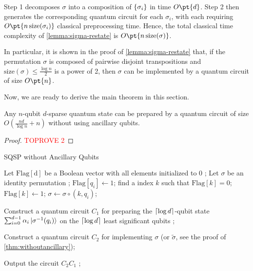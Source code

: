 \documentclass[a4paper,UKenglish,cleveref, autoref, thm-restate]{lipics-v2021}
\DeclarePairedDelimiter\rbra{\lparen}{\rparen}
\DeclarePairedDelimiter\cbra{\{}{\}}
\DeclarePairedDelimiter\ceil{\lceil}{\rceil}
\newcommand{\bo}{O\pt}
\begin{document}
Step 1 decomposes $\sigma$ into a composition of $\cbra{\sigma_i}$ in time $\bo{d}$. Step 2 then generates the corresponding quantum circuit for each $\sigma_i$, with each requiring $\bo{n\,\mathrm{size}(\sigma_i)}$ classical preprocessing time. Hence, the total classical time complexity of \cref{lemma:sigma-restate} is $\bo{n\,\mathrm{size}(\sigma)}$.

\begin{remark}\label{remark:sigma}
    In particular, it is shown in the proof of \cref{lemma:sigma-restate} that, if the permutation $\sigma$ is composed of pairwise disjoint transpositions and $\mathrm{size}(\sigma) \leq \frac{\log n}{2}$ is a power of 2, then $\sigma$ can be implemented by a quantum circuit of size $\bo{n}$.
\end{remark}

Now, we are ready to derive the main theorem in this section. 
\begin{theorem}
Any $n$-qubit $d$-sparse quantum state can be prepared by a quantum circuit of size $O(\frac{nd}{\log n} + n)$ without using ancillary qubits.
\end{theorem}


\begin{proof}\textcolor{red}{TOPROVE 2}\end{proof}


\begin{algorithm}[htbp]
\caption{SQSP without Ancillary Qubits}\label{alg:withoutancillary} 
\begin{algorithmic}[1]

    \STATE Let $\mathrm{Flag[d]}$ be a Boolean vector with all elements initialized to $0$ ;
    \STATE Let $\sigma$ be an identity permutation ;
    \STATE $\mathrm{Flag}[q_i] \xleftarrow{} 1$;
    \ENDIF
    \ENDFOR
    \STATE find a index $k$ such that $\mathrm{Flag}[k] = 0$;
    \STATE $\mathrm{Flag}[k] \xleftarrow{} 1$;
    $\sigma \xleftarrow{} \sigma \circ (k, q_i)$;
    \ENDIF
    \ENDFOR

    \STATE Construct a quantum circuit $C_1$ for preparing the $\ceil{\log d}$-qubit state $\sum_{i=0}^{d-1} \alpha_i \ket{\sigma^{-1}(q_i)}$ on the $\ceil{\log d}$ least significant qubits ;

    \STATE Construct a quantum circuit $C_2$ for implementing $\sigma$ (or $\widetilde{\sigma}$, see the proof of \cref{thm:withoutancillary});

    \STATE Output the circuit $C_2C_1$ ; 
\end{algorithmic}

\end{algorithm}
\end{document}
